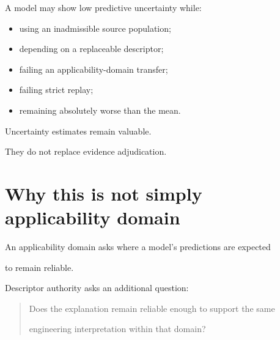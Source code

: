 \documentclass[11pt,a4paper,oneside]{report}
\begin{document}
A model may show low predictive uncertainty while:



\begin{itemize}



\item

using an inadmissible source population;



\item

depending on a replaceable descriptor;



\item

failing an applicability-domain transfer;



\item

failing strict replay;



\item

remaining absolutely worse than the mean.



\end{itemize}



Uncertainty estimates remain valuable.



They do not replace evidence adjudication.





\section{Why this is not simply applicability domain}



An applicability domain asks where a model's predictions are expected

to remain reliable.



Descriptor authority asks an additional question:



\begin{quote}



Does the explanation remain reliable enough to support the same

engineering interpretation within that domain?



\end{quote}
\end{document}
